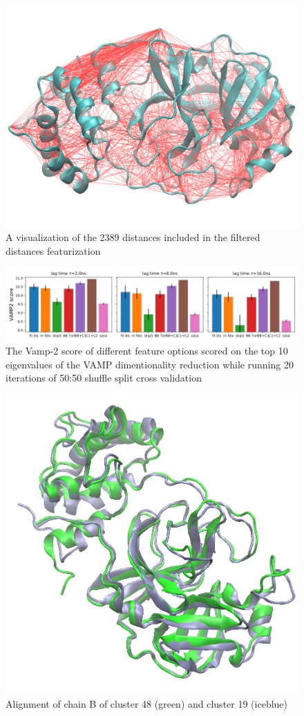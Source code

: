 \documentclass{biophys-new}
\begin{document}
\begin{figure}[hbt!]
\centering
\includegraphics[width=0.6\linewidth]{supplemental_figures/fdis-visualization_smaller.png}
\caption{A visualization of the 2389 distances included in the filtered distances featurization}
\label{fig:view}
\end{figure}

\begin{figure}[hbt!]
\centering
\includegraphics[width=0.6\linewidth]{supplemental_figures/sup_fig_2_vamp_score.png}
\caption{The Vamp-2 score of different feature options scored on the top 10 eigenvalues of the VAMP dimentionality reduction while running 20 iterations of 50:50 shuffle split cross validation}
\label{fig:view}
\end{figure}

\begin{figure}  %
\centering
\includegraphics[width=0.6\linewidth]{supplemental_figures/green48_iceblue19_smaller.png}
\caption{Alignment of chain B of cluster 48 (green) and cluster 19 (iceblue)}
\label{fig:view}
\end{figure}
\end{document}
